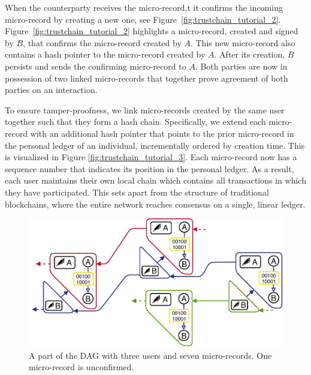 When the counterparty receives the micro-record,t it confirms the incoming micro-record by creating a new one, see Figure~\ref{fig:trustchain_tutorial_2}.
Figure~\ref{fig:trustchain_tutorial_2} highlights a micro-record, created and signed by $ B $, that confirms the micro-record created by $ A $.
This new micro-record also contains a hash pointer to the micro-record created by $ A $.
After its creation, $ B $ persists and sends the confirming micro-record to $ A $.
Both parties are now in possession of two linked micro-records that together prove agreement of both parties on an interaction.

To ensure tamper-proofness, we link micro-records created by the same user together such that they form a hash chain.
Specifically, we extend each micro-record with an additional hash pointer that points to the prior micro-record in the personal ledger of an individual, incrementally ordered by creation time.
This is visualized in Figure \ref{fig:trustchain_tutorial_3}.
Each micro-record now has a sequence number that indicates its position in the personal ledger.
As a result, each user maintains their own local chain which contains all transactions in which they have participated.
This sets \ModelName{} apart from the structure of traditional blockchains, where the entire network reaches consensus on a single, linear ledger.

\begin{figure}[t]
	\centering
	\includegraphics[width=\linewidth]{trustchain/assets/fullchain}
	\caption{A part of the \ModelName{} DAG with three users and seven micro-records. One micro-record is unconfirmed.}
	\label{fig:fullchain}
\end{figure}

